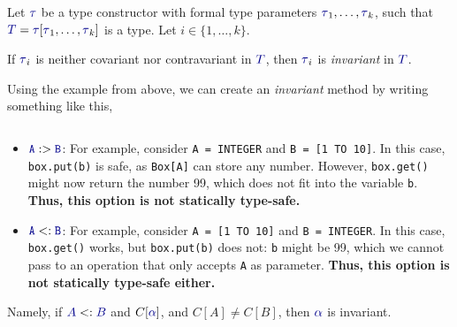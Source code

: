 \begin{definition}[Invariance]\label{def:Type_Invariance}
  Let $\DataType$ be a type constructor with formal type parameters $\DataType_{1}, \ldots , \DataType_{k}$, such that $\SemanticType{T} = \DataType [\DataType_{1}, \ldots, \DataType_{k}]$ is a type.
  Let $i \in \lbrace 1,\ldots, k \rbrace$.

  If $\DataType_{i}$ is neither covariant nor contravariant in $\SemanticType{T}$, then $\DataType_{i}$ is \emph{invariant} in $\SemanticType{T}$.

  Using the  example from above, we can create an \emph{invariant} method by writing something like this,
  \inputminted[frame=lines,linenos]{scala}{./EDAP05-Concepts_Programming_Languages-Sections/Advanced_Data_Types/Code/InvariantBox.scala}
  \begin{itemize}[noitemsep]
  \item $\mathtt{\SemanticType{A}} :> \mathtt{\SemanticType{B}}$: For example, consider \texttt{A = INTEGER} and \texttt{B = [1 TO 10]}.
    In this case, \texttt{box.put(b)} is safe, as \texttt{Box[A]} can store any number. However, \texttt{box.get()} might now return the number 99, which does not fit into the variable \texttt{b}.
    \textbf{Thus, this option is not statically type-safe.}
  \item $\mathtt{\SemanticType{A}} <: \mathtt{\SemanticType{B}}$: For example, consider \texttt{A = [1 TO 10]} and \texttt{B = INTEGER}.
    In this case, \texttt{box.get()} works, but \texttt{box.put(b)} does not: \texttt{b} might be 99, which we cannot pass to an operation that only accepts \texttt{A} as parameter.
    \textbf{Thus, this option is not statically type-safe either.}
  \end{itemize}

  Namely, if $\SemanticType{A} <: \SemanticType{B}$ and $C[\SemanticType{\alpha}]$, and $C[A] \neq C[B]$, then $\SemanticType{\alpha}$ is invariant.
\end{definition}

